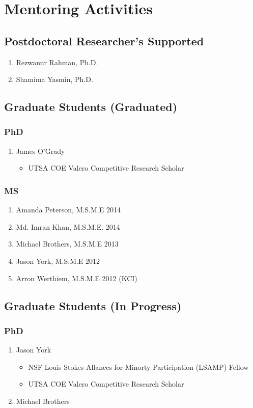 \section*{Mentoring Activities}


\subsection*{Postdoctoral Researcher's Supported}
  \begin{enumerate}
    \item Rezwanur Rahman, Ph.D.
    \item Shamima Yasmin, Ph.D.
  \end{enumerate}

\subsection*{Graduate Students (Graduated)}

\subsubsection*{PhD}
\begin{enumerate}
  \item James O'Grady
      \begin{itemize}
        \item UTSA COE Valero Competitive Research Scholar
      \end{itemize}
\end{enumerate}

\subsubsection*{MS}
\begin{enumerate}
    \item Amanda Peterson, M.S.M.E 2014
    \item Md. Imran Khan, M.S.M.E. 2014
    \item Michael Brothers, M.S.M.E 2013
    \item Jason York, M.S.M.E 2012
    \item Arron Werthiem, M.S.M.E 2012 (KCI)
\end{enumerate}

\subsection*{Graduate Students (In Progress)}

\subsubsection*{PhD}
\begin{enumerate}
  \item Jason York
      \begin{itemize}
        \item NSF Louis Stokes Allances for Minorty Participation (LSAMP) Fellow
        \item UTSA COE Valero Competitive Research Scholar
      \end{itemize}
  \item Michael Brothers
\end{enumerate}

